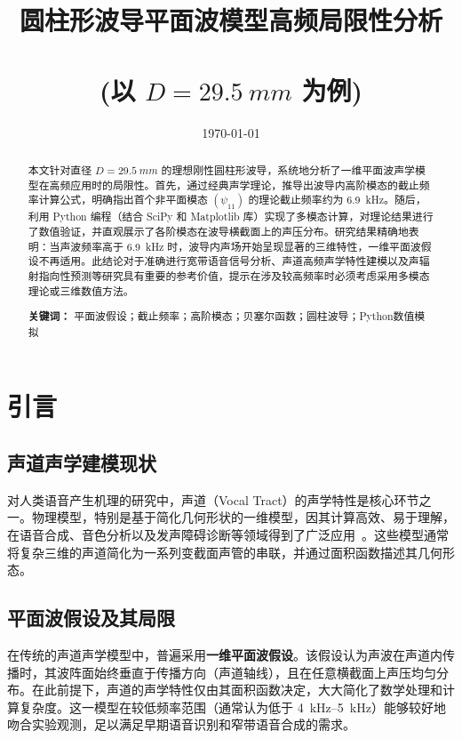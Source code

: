 \documentclass[12pt,a4paper]{article}
\title{圆柱形波导平面波模型高频局限性分析 \\\\ (以 $D=\SI{29.5}{mm}$ 为例)}
\author{ } %
\date{\today}
\begin{document}
\maketitle

\begin{abstract}
本文针对直径 $D=\SI{29.5}{mm}$ 的理想刚性圆柱形波导，系统地分析了一维平面波声学模型在高频应用时的局限性。首先，通过经典声学理论，推导出波导内高阶模态的截止频率计算公式，明确指出首个非平面模态 $(\psi_{11})$ 的理论截止频率约为 \SI{6.9}{kHz}。随后，利用 Python 编程（结合 SciPy 和 Matplotlib 库）实现了多模态计算，对理论结果进行了数值验证，并直观展示了各阶模态在波导横截面上的声压分布。研究结果精确地表明：当声波频率高于 \SI{6.9}{kHz} 时，波导内声场开始呈现显著的三维特性，一维平面波假设不再适用。此结论对于准确进行宽带语音信号分析、声道高频声学特性建模以及声辐射指向性预测等研究具有重要的参考价值，提示在涉及较高频率时必须考虑采用多模态理论或三维数值方法。\par
\vspace{1em}
\textbf{关键词：} 平面波假设；截止频率；高阶模态；贝塞尔函数；圆柱波导；Python数值模拟
\end{abstract}

\tableofcontents
\newpage

\section{引言}

\subsection{声道声学建模现状}
对人类语音产生机理的研究中，声道（Vocal Tract）的声学特性是核心环节之一。物理模型，特别是基于简化几何形状的一维模型，因其计算高效、易于理解，在语音合成、音色分析以及发声障碍诊断等领域得到了广泛应用~\cite{bib:Story1996, bib:Fant1960}。这些模型通常将复杂三维的声道简化为一系列变截面声管的串联，并通过面积函数描述其几何形态。

\subsection{平面波假设及其局限}
在传统的声道声学模型中，普遍采用\textbf{一维平面波假设}。该假设认为声波在声道内传播时，其波阵面始终垂直于传播方向（声道轴线），且在任意横截面上声压均匀分布。在此前提下，声道的声学特性仅由其面积函数决定，大大简化了数学处理和计算复杂度。这一模型在较低频率范围（通常认为低于 \SIrange{4}{5}{\kilo\hertz}）能够较好地吻合实验观测，足以满足早期语音识别和窄带语音合成的需求。
\end{document}
